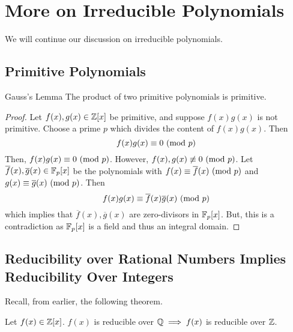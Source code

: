 \documentclass[letterpaper]{article}
\begin{document}
\section{More on Irreducible Polynomials}
We will continue our discussion on irreducible polynomials.

\subsection{Primitive Polynomials}
\begin{lemma}{Gauss's Lemma}{}
    The product of two primitive polynomials is primitive.
\end{lemma}

\begin{mdframed}[]
    \begin{proof}
        Let $f(x), g(x) \in \mathbb{Z}[x]$ be primitive, and suppose $f(x)g(x)$ is not primitive. Choose a prime $p$ which divides the content of $f(x)g(x)$. Then 
        \[f(x)g(x) \equiv 0 \ (\mathrm{mod}\ p)\]
        Then, $f(x)g(x) \equiv 0 \ (\mathrm{mod}\ p)$. However, $f(x), g(x) \not\equiv 0 \ (\mathrm{mod}\ p)$. Let $\overline{f}(x), \overline{g}(x) \in \mathbb{F}_{p}[x]$ be the polynomials with $f(x) \equiv \overline{f}(x) \ (\mathrm{mod}\ p)$ and $g(x) \equiv \overline{g}(x) \ (\mathrm{mod}\ p)$. Then
        \[f(x)g(x) \equiv \overline{f}(x)\overline{g}(x) \ (\mathrm{mod}\ p)\]
        which implies that $\overline{f}(x), \overline{g}(x)$ are zero-divisors in $\mathbb{F}_{p}[x]$. But, this is a contradiction as $\mathbb{F}_{p}[x]$ is a field and thus an integral domain. 
    \end{proof}
\end{mdframed}

\subsection{Reducibility over Rational Numbers Implies Reducibility Over Integers}
Recall, from earlier, the following theorem. 
\begin{theorem}{}{}
    Let $f(x) \in \mathbb{Z}[x]$. $f(x)$ is reducible over $\mathbb{Q} \implies f(x)$ is reducible over $\mathbb{Z}$.
\end{theorem}
\end{document}
